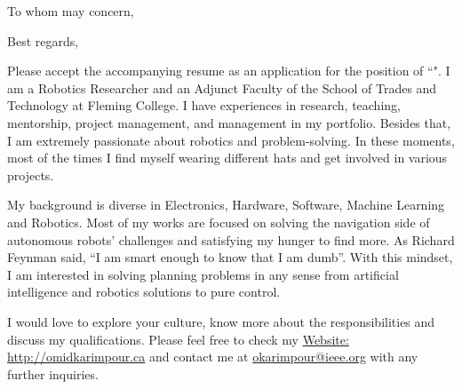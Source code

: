 \documentclass[12pt,letterpaper,roman]{moderncv}
\begin{document}
\date{\today}
\opening{To whom may concern,}
\closing{Best regards,}
\makelettertitle

Please accept the accompanying resume as an application for the position of “". I am a Robotics Researcher and an Adjunct Faculty of the School of Trades and Technology at Fleming College. I have experiences in research, teaching, mentorship, project management, and management in my portfolio. Besides that, I am extremely passionate about robotics and problem-solving. In these moments, most of the times I find myself wearing different hats and get involved in various projects. 

My background is diverse in Electronics, Hardware, Software, Machine Learning and Robotics. Most of my works are focused on solving the navigation side of autonomous robots’ challenges and satisfying my hunger to find more. As Richard Feynman said, “I am smart enough to know that I am dumb”. With this mindset, I am interested in solving planning problems in any sense from artificial intelligence and robotics solutions to pure control. 

I would love to explore your culture, know more about the responsibilities and discuss my qualifications. Please feel free to check my \href{http://omidkarimpour.ca}{Website: http://omidkarimpour.ca} and contact me at \href{mailto:okarimpour@ieee.org}{okarimpour@ieee.org} with any further inquiries.

\vspace{0.5cm}


\makeletterclosing
\end{document}
